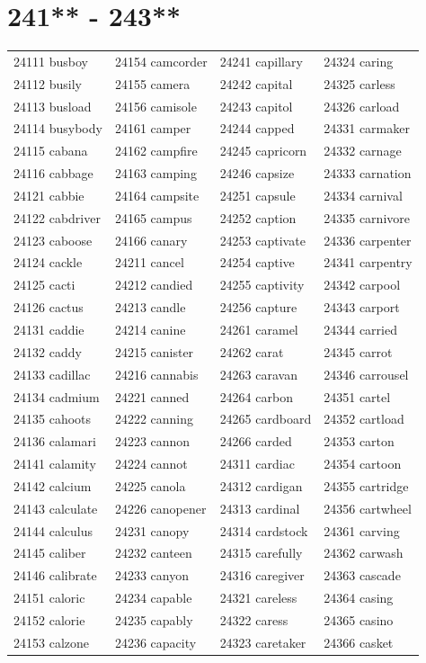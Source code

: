 \documentclass[10pt, oneside]{book}
\begin{document}
\begin{table}
	\centering
	\section*{241** - 243**}
	\begin{tabular}{l l l l}
24111 busboy &24154 camcorder &24241 capillary &24324 caring\\
24112 busily &24155 camera &24242 capital &24325 carless\\
24113 busload &24156 camisole &24243 capitol &24326 carload\\
24114 busybody &24161 camper &24244 capped &24331 carmaker\\
24115 cabana &24162 campfire &24245 capricorn &24332 carnage\\
24116 cabbage &24163 camping &24246 capsize &24333 carnation\\
24121 cabbie &24164 campsite &24251 capsule &24334 carnival\\
24122 cabdriver &24165 campus &24252 caption &24335 carnivore\\
24123 caboose &24166 canary &24253 captivate &24336 carpenter\\
24124 cackle &24211 cancel &24254 captive &24341 carpentry\\
24125 cacti &24212 candied &24255 captivity &24342 carpool\\
24126 cactus &24213 candle &24256 capture &24343 carport\\
24131 caddie &24214 canine &24261 caramel &24344 carried\\
24132 caddy &24215 canister &24262 carat &24345 carrot\\
24133 cadillac &24216 cannabis &24263 caravan &24346 carrousel\\
24134 cadmium &24221 canned &24264 carbon &24351 cartel\\
24135 cahoots &24222 canning &24265 cardboard &24352 cartload\\
24136 calamari &24223 cannon &24266 carded &24353 carton\\
24141 calamity &24224 cannot &24311 cardiac &24354 cartoon\\
24142 calcium &24225 canola &24312 cardigan &24355 cartridge\\
24143 calculate &24226 canopener &24313 cardinal &24356 cartwheel\\
24144 calculus &24231 canopy &24314 cardstock &24361 carving\\
24145 caliber &24232 canteen &24315 carefully &24362 carwash\\
24146 calibrate &24233 canyon &24316 caregiver &24363 cascade\\
24151 caloric &24234 capable &24321 careless &24364 casing\\
24152 calorie &24235 capably &24322 caress &24365 casino\\
24153 calzone &24236 capacity &24323 caretaker &24366 casket\\
	\end{tabular}
 \end{table}
\clearpage
\end{document}
